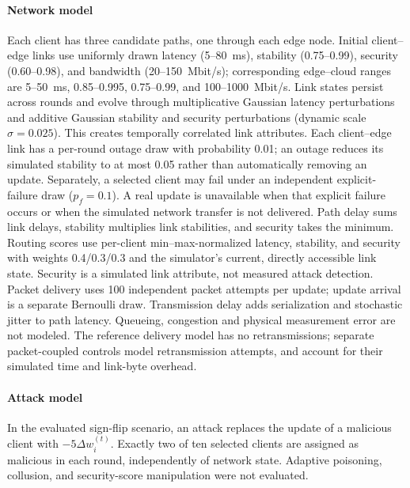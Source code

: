 \documentclass[5p,times,numafflabel]{elsarticle}
\begin{document}
\paragraph{Network model}
Each client has three candidate paths, one through each edge node.
Initial client--edge links use uniformly drawn latency (5--80~ms),
stability (0.75--0.99), security (0.60--0.98), and bandwidth
(20--150~Mbit/s); corresponding edge--cloud ranges are 5--50~ms,
0.85--0.995, 0.75--0.99, and 100--1000~Mbit/s. Link states persist across rounds and evolve through multiplicative
Gaussian latency perturbations and additive Gaussian stability and
security perturbations (dynamic scale $\sigma=0.025$). This creates
temporally correlated link attributes. Each client--edge link has a
per-round outage draw with probability 0.01; an outage reduces its
simulated stability to at most 0.05 rather than automatically
removing an update. Separately, a selected client may fail under
an independent explicit-failure draw ($p_f=0.1$). A real update is
unavailable when that explicit failure occurs or when the simulated
network transfer is not delivered. Path delay sums link delays, stability multiplies
link stabilities, and security takes the minimum. Routing scores use
per-client min--max-normalized latency, stability, and security with
weights 0.4/0.3/0.3 and the simulator's current, directly accessible
link state. Security is a simulated link attribute, not measured
attack detection. Packet delivery uses 100 independent packet
attempts per update; update arrival is a separate Bernoulli draw.
Transmission delay adds serialization and stochastic jitter to path
latency. Queueing, congestion and physical measurement error are not
modeled. The reference delivery model has no retransmissions;
separate packet-coupled controls model retransmission attempts,
and account for their simulated time and link-byte overhead.

\paragraph{Attack model}
In the evaluated sign-flip scenario, an attack replaces the update
of a malicious client with $-5\Delta w_i^{(t)}$. Exactly two of ten
selected clients are assigned as malicious in each round,
independently of network state. Adaptive poisoning, collusion, and
security-score manipulation were not evaluated.
\end{document}
